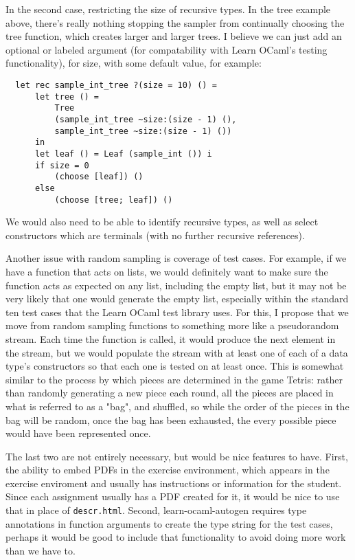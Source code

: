 \documentclass[11pt]{article}
\begin{document}
In the second case, restricting the size of recursive types. In the tree example above, there's really nothing stopping the sampler from continually choosing the tree function, which creates larger and larger trees. I believe we can just add an optional or labeled argument (for compatability with Learn OCaml's testing functionality), for size, with some default value, for example:

\begin{lstlisting}
  let rec sample_int_tree ?(size = 10) () =
      let tree () =
          Tree
          (sample_int_tree ~size:(size - 1) (),
          sample_int_tree ~size:(size - 1) ())
      in
      let leaf () = Leaf (sample_int ()) i
      if size = 0
          (choose [leaf]) ()
      else
          (choose [tree; leaf]) ()
\end{lstlisting}

We would also need to be able to identify recursive types, as well as select constructors which are terminals (with no further recursive references).

Another issue with random sampling is coverage of test cases. For example, if we have a function that acts on lists, we would definitely want to make sure the function acts as expected on any list, including the empty list, but it may not be very likely that one would generate the empty list, especially within the standard ten test cases that the Learn OCaml test library uses. For this, I propose that we move from random sampling functions to something more like a pseudorandom stream. Each time the function is called, it would produce the next element in the stream, but we would populate the stream with at least one of each of a data type's constructors so that each one is tested on at least once. This is somewhat similar to the process by which pieces are determined in the game Tetris: rather than randomly generating a new piece each round, all the pieces are placed in what is referred to as a "bag", and shuffled, so while the order of the pieces in the bag will be random, once the bag has been exhausted, the every possible piece would have been represented once.

The last two are not entirely necessary, but would be nice features to have. First, the ability to embed PDFs in the exercise environment, which appears in the exercise enviroment and usually has instructions or information for the student. Since each assignment usually has a PDF created for it, it would be nice to use that in place of \verb+descr.html+. Second, learn-ocaml-autogen requires type annotations in function arguments to create the type string for the test cases, perhaps it would be good to include that functionality to avoid doing more work than we have to.

{}

\end{document}
